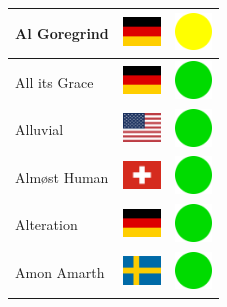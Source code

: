 \documentclass[12pt, a4paper, twoside]{report}
\begin{document}
\begin{center}
\begin{longtable}{|p{5cm}|p{2cm}|p{2cm}|}
 Al Goregrind                                               & \includegraphics[width=1cm]{4x3/de} &   \includegraphics[width=1cm]{likes/m} \\ \hline
 All its Grace                                              & \includegraphics[width=1cm]{4x3/de} &   \includegraphics[width=1cm]{likes/y} \\ \hline
 Alluvial                                                   & \includegraphics[width=1cm]{4x3/us} &   \includegraphics[width=1cm]{likes/y} \\ \hline
 Almøst Human                                               & \includegraphics[width=1cm]{4x3/ch} &   \includegraphics[width=1cm]{likes/y} \\ \hline
 Alteration                                                 & \includegraphics[width=1cm]{4x3/de} &   \includegraphics[width=1cm]{likes/y} \\ \hline
 Amon Amarth                                                & \includegraphics[width=1cm]{4x3/se} &   \includegraphics[width=1cm]{likes/y} \\ \hline

\end{longtable}
\end{center}
\end{document}
